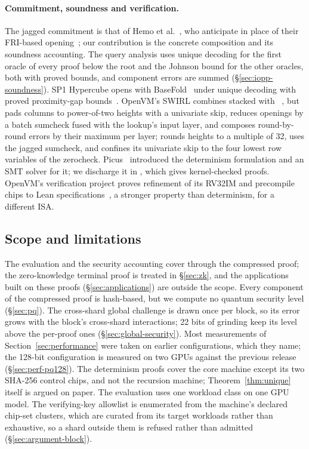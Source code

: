 \paragraph{Commitment, soundness and verification.} The jagged commitment is that of Hemo et al.~\citep{jagged-pcs}, who anticipate \WHIR{} in place of their FRI-based opening~\citep[Rem.~7.1]{jagged-pcs}; our contribution is the concrete composition and its soundness accounting. The query analysis uses unique decoding for the first oracle of every proof below the root and the Johnson bound for the other oracles, both with proved bounds, and component errors are summed (\S\ref{sec:iopp-soundness}). SP1 Hypercube opens with BaseFold~\citep{basefold} under unique decoding with proved proximity-gap bounds~\citep{sp1-security}. OpenVM's SWIRL combines stacked \WHIR{} with \LogUp{}~\citep{swirl}, but pads columns to power-of-two heights with a univariate skip, reduces openings by a batch sumcheck fused with the lookup's input layer, and composes round-by-round errors by their maximum per layer; \Ziren{} rounds heights to a multiple of 32, uses the jagged sumcheck, and confines its univariate skip to the four lowest row variables of the zerocheck. Picus~\citep{picus} introduced the determinism formulation and an SMT solver for it; we discharge it in \Lean{}, which gives kernel-checked proofs. OpenVM's verification project proves refinement of its RV32IM and precompile chips to Lean specifications~\citep{openvm-fv}, a stronger property than determinism, for a different ISA.

\subsection{Scope and limitations}
\label{sec:scope}

The evaluation and the security accounting cover \Ziren{} through the compressed proof; the zero-knowledge terminal proof is treated in \S\ref{sec:zk}, and the applications built on these proofs (\S\ref{sec:applications}) are outside the scope. Every component of the compressed proof is hash-based, but we compute no quantum security level (\S\ref{sec:pq}). The cross-shard global challenge is drawn once per block, so its error grows with the block's cross-shard interactions; 22 bits of grinding keep its level above the per-proof ones (\S\ref{sec:global-security}). Most measurements of Section~\ref{sec:performance} were taken on earlier configurations, which they name; the 128-bit configuration is measured on two GPUs against the previous release (\S\ref{sec:perf-pq128}). The determinism proofs cover the core machine except its two SHA-256 control chips, and not the recursion machine; Theorem~\ref{thm:unique} itself is argued on paper. The evaluation uses one workload class on one GPU model. The verifying-key allowlist is enumerated from the machine's declared chip-set clusters, which are curated from its target workloads rather than exhaustive, so a shard outside them is refused rather than admitted (\S\ref{sec:argument-block}).

